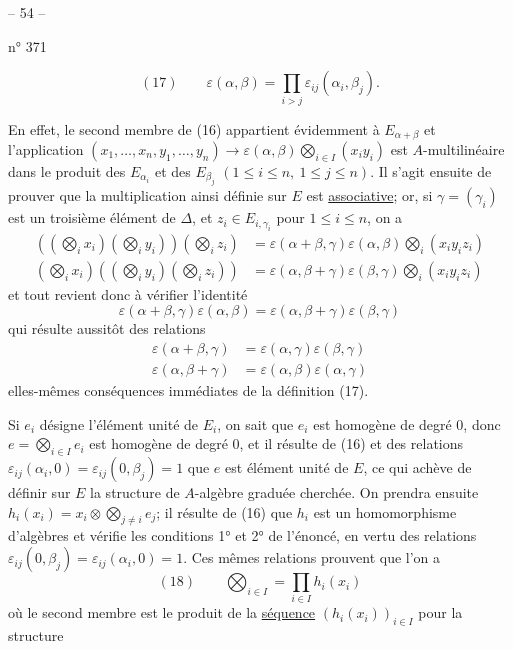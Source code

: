 \begin{center}-- 54 --\end{center}
\hfill n° 371

\[
(17)\qquad \varepsilon(\alpha,\beta)=\prod_{i>j}\varepsilon_{ij}(\alpha_i,\beta_j).
\]

En effet, le second membre de (16) appartient évidemment à $E_{\alpha+\beta}$ et l'application $(x_1,\ldots,x_n,y_1,\ldots,y_n)\longrightarrow\varepsilon(\alpha,\beta)\bigotimes_{i\in I}(x_i y_i)$ est $A$-multilinéaire dans le produit des $E_{\alpha_i}$ et des $E_{\beta_j}$ $(1\leq i\leq n,\ 1\leq j\leq n)$. Il s'agit ensuite de prouver que la multiplication ainsi définie sur $E$ est \uline{associative}; or, si $\gamma=(\gamma_i)$ est un troisième élément de $\Delta$, et $z_i\in E_{i,\gamma_i}$ pour $1\leq i\leq n$, on a
\[
\begin{aligned}
((\bigotimes_i x_i)(\bigotimes_i y_i))(\bigotimes_i z_i)&=\varepsilon(\alpha+\beta,\gamma)\varepsilon(\alpha,\beta)\bigotimes_i(x_i y_i z_i)\\
(\bigotimes_i x_i)((\bigotimes_i y_i)(\bigotimes_i z_i))&=\varepsilon(\alpha,\beta+\gamma)\varepsilon(\beta,\gamma)\bigotimes_i(x_i y_i z_i)
\end{aligned}
\]
et tout revient donc à vérifier l'identité
\[
\varepsilon(\alpha+\beta,\gamma)\varepsilon(\alpha,\beta)=\varepsilon(\alpha,\beta+\gamma)\varepsilon(\beta,\gamma)
\]
qui résulte aussitôt des relations
\[
\begin{aligned}
\varepsilon(\alpha+\beta,\gamma)&=\varepsilon(\alpha,\gamma)\varepsilon(\beta,\gamma)\\
\varepsilon(\alpha,\beta+\gamma)&=\varepsilon(\alpha,\beta)\varepsilon(\alpha,\gamma)
\end{aligned}
\]
elles-mêmes conséquences immédiates de la définition (17).

Si $e_i$ désigne l'élément unité de $E_i$, on sait que $e_i$ est homogène de degré 0, donc $e=\bigotimes_{i\in I}e_i$ est homogène de degré 0, et il résulte de (16) et des relations $\varepsilon_{ij}(\alpha_i,0)=\varepsilon_{ij}(0,\beta_j)=1$ que $e$ est élément unité de $E$, ce qui achève de définir sur $E$ la structure de $A$-algèbre graduée cherchée. On prendra ensuite $h_i(x_i)=x_i\otimes\bigotimes_{j\ne i}e_j$; il résulte de (16) que $h_i$ est un homomorphisme d'algèbres et vérifie les conditions 1° et 2° de l'énoncé, en vertu des relations $\varepsilon_{ij}(0,\beta_j)=\varepsilon_{ij}(\alpha_i,0)=1$. Ces mêmes relations prouvent que l'on a
\[
(18)\qquad \bigotimes_{i\in I}=\prod_{i\in I}h_i(x_i)
\]
où le second membre est le produit de la \uline{séquence} $(h_i(x_i))_{i\in I}$ pour la structure
